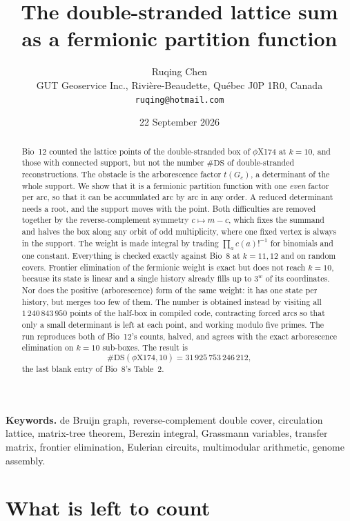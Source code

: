 \documentclass[11pt]{article}
\title{\bfseries The double-stranded lattice sum\\ as a fermionic partition function}
\author{Ruqing Chen\\[2pt]
\normalsize GUT Geoservice Inc., Rivi\`ere-Beaudette, Qu\'ebec J0P 1R0, Canada\\
\normalsize\texttt{ruqing@hotmail.com}}
\date{22 September 2026}
\theoremstyle{plain}
\theoremstyle{definition}
\theoremstyle{remark}
\newcommand{\DS}{\mathrm{DS}}
\begin{document}
\maketitle

\begin{abstract}
\noindent
Bio~12 counted the lattice points of the double-stranded box of $\phi$X174 at $k=10$, and
those with connected support, but not the number $\#\DS$ of double-stranded
reconstructions. The obstacle is the arborescence factor $t(G_c)$, a determinant of the whole
support. We show that it is a fermionic partition function with one \emph{even} factor per
arc, so that it can be accumulated arc by arc in any order. A reduced determinant needs a
root, and the support moves with the point. Both difficulties are removed together by the
reverse-complement symmetry $c\mapsto m-c$, which fixes the summand and halves the box along
any orbit of odd multiplicity, where one fixed vertex is always in the support. The weight is
made integral by trading $\prod_a c(a)!^{-1}$ for binomials and one constant. Everything is
checked exactly against Bio~8 at $k=11,12$ and on random covers. Frontier elimination of the
fermionic weight is exact but does not reach $k=10$, because its state is linear and a single
history already fills up to $3^{w}$ of its coordinates. Nor does the positive (arborescence)
form of the same weight: it has one state per history, but merges too few of them. The number
is obtained instead by visiting all $1\,240\,843\,950$ points of the half-box in compiled
code, contracting forced arcs so that only a small determinant is left at each point, and
working modulo five primes. The run reproduces both of Bio~12's counts, halved, and agrees with
the exact arborescence elimination on $k=10$ sub-boxes. The result is
\[
\#\DS(\phi\mathrm{X}174,10)=31\,925\,753\,246\,212 ,
\]
the last blank entry of Bio~8's Table~2.
\end{abstract}

\medskip
\noindent\textbf{Keywords.} de Bruijn graph, reverse-complement double cover, circulation
lattice, matrix-tree theorem, Berezin integral, Grassmann variables, transfer matrix,
frontier elimination, Eulerian circuits, multimodular arithmetic, genome assembly.

\section{What is left to count}\label{sec:left}
\end{document}
